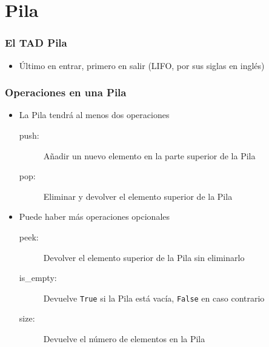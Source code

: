 \documentclass[11pt]{beamer}
\begin{document}
\section{Pila}

\begin{frame}\frametitle{El TAD Pila}
\begin{itemize}
\item Último en entrar, primero en salir (LIFO, por sus siglas en inglés)
\end{itemize}
\vspace{0.4cm}
\begin{center}
\end{center}
\end{frame}

\begin{frame}\frametitle{Operaciones en una Pila}
\begin{itemize}
\item La Pila tendrá al menos dos operaciones
    \begin{description}
    \item[push:] Añadir un nuevo elemento en la parte superior de la Pila
    \item[pop:] Eliminar y devolver el elemento superior de la Pila
    \end{description}
\item Puede haber más operaciones opcionales
    \begin{description}
    \item[peek:] Devolver el elemento superior de la Pila sin eliminarlo
    \item[is\_empty:] Devuelve \lstinline|True| si la Pila está vacía, \lstinline|False| en caso contrario
    \item[size:] Devuelve el número de elementos en la Pila
    \end{description}
\end{itemize}
\end{frame}
\end{document}
